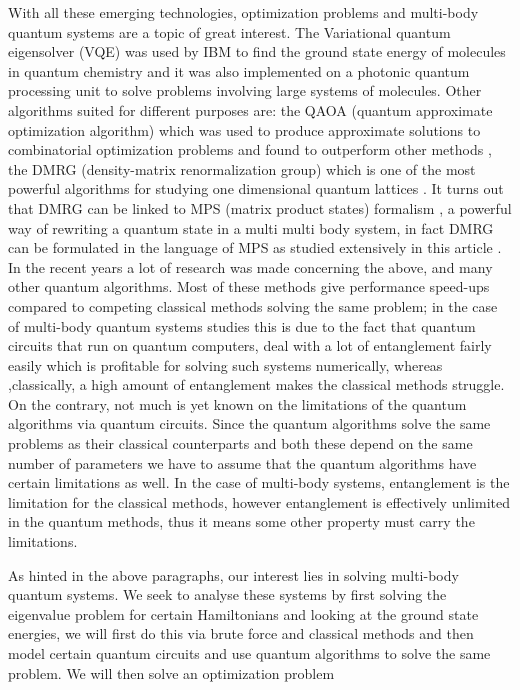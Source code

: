 \documentclass{physics_article}
\begin{document}
	With all these emerging technologies, optimization problems and multi-body quantum systems are a topic of great interest. The Variational quantum eigensolver (VQE) was used by IBM to find the ground state energy of molecules in  quantum chemistry \cite{kandala_mezzacapo_temme_takita_brink_chow_gambetta_2017} and it was also implemented on a photonic quantum processing unit \cite{peruzzo_mcclean_shadbolt_yung_zhou_love_aspuru-guzik_obrien_2014} to solve problems involving large systems of molecules. Other algorithms suited for different purposes are: the QAOA (quantum approximate optimization algorithm) which was used to produce approximate solutions to combinatorial optimization problems \cite{https://doi.org/10.48550/arxiv.1411.4028} and found to outperform other methods \cite{PhysRevX.10.021067}, the DMRG (density-matrix renormalization group) which is one of the most powerful algorithms for studying one dimensional quantum lattices \cite{schollwock_2005,hallberg_2006}. It turns out that DMRG can be linked to MPS (matrix product states) formalism \cite{https://doi.org/10.48550/arxiv.quant-ph/0608197}, a powerful way of rewriting a quantum state in a multi multi body system, in fact DMRG can be formulated in the language of MPS as studied extensively in this article \cite{schollwock_2011}. In the recent years a lot of research was made concerning the above, and many other quantum algorithms. Most of these methods give performance speed-ups compared to competing classical methods solving the same problem; in the case of multi-body quantum systems studies this is due to the fact that quantum circuits that run on quantum computers, deal with a lot of entanglement fairly easily which is profitable for solving such systems numerically, whereas ,classically, a high amount of entanglement makes the classical methods struggle. On the contrary, not much is yet known on the limitations of the quantum algorithms via quantum circuits. Since the quantum algorithms solve the same problems as their classical counterparts and both these depend on the same number of parameters we have to assume that the quantum algorithms have certain limitations as well. In the case of multi-body systems, entanglement is the limitation for the classical methods, however entanglement is effectively unlimited in the quantum methods, thus it means some other property must carry the limitations.  

	As hinted in the above paragraphs, our interest lies in solving multi-body quantum systems. We seek to analyse these systems by first solving the eigenvalue problem for certain Hamiltonians and looking at the ground state energies, we will first do this via brute force and classical methods and then model certain quantum circuits and use quantum algorithms to solve the same problem. We will then solve an optimization problem
\end{document}
